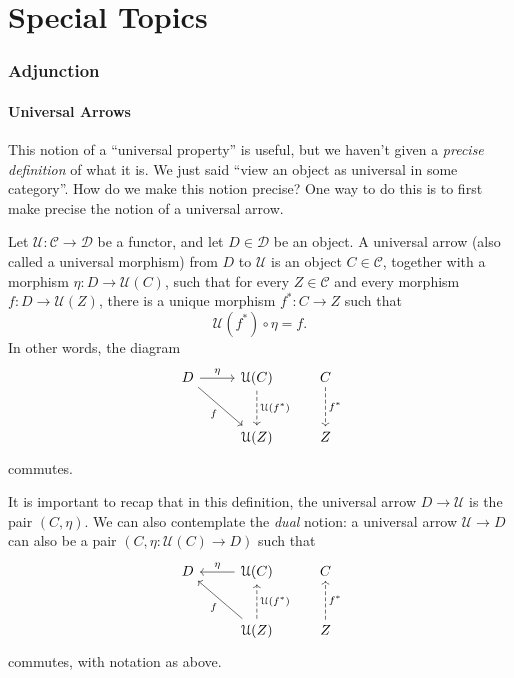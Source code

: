 \part{Special Topics}
\section{Adjunction}

\subsection{Universal Arrows}

This notion of a ``universal property'' is useful, but we haven't given a \emph{precise definition} of what it is. We just said ``view an object as universal in some category''. How do we make this notion precise? One way to do this is to first make precise the notion of a universal arrow.

\begin{definition}\label{dfn:7}
	Let $\mathcal{U} : \mathcal{C}  \to \mathcal{D} $ be a functor, and let $D\in \mathcal{D} $ be an object. A universal arrow (also called a universal morphism) from $D$ to $\mathcal{U} $ is an object $C\in \mathcal{C} $, together with a morphism $\eta : D \to \mathcal{U} (C)$, such that for every $Z\in \mathcal{C} $ and every morphism $f : D \to \mathcal{U} (Z)$, there is a unique morphism $f^*: C \to Z$ such that
	\[
		\mathcal{U} (f^*)\circ \eta =f
	.\]
	In other words, the diagram
	\[\begin{tikzcd}[row sep = 2.5em, column sep = 2.5em]
	D\ar[" \eta  ", r] \ar[" f "', dr]  & \mathcal{U} (C)\ar[" \mathcal{U} (f^*) ", dashed, d]  & C\ar[" f^* ", dashed, d]  \\
	 & \mathcal{U} (Z) & Z
	\end{tikzcd}\]
	commutes.
\end{definition}

It is important to recap that in this definition, the universal arrow $D\to \mathcal{U} $ is the pair $(C,\eta )$. We can also contemplate the \emph{dual} notion: a universal arrow $\mathcal{U} \to D$ can also be a pair $(C,\eta : \mathcal{U} (C) \to D)$ such that
\[\begin{tikzcd}[row sep = 2.5em, column sep = 2.5em]
D & \mathcal{U} (C)\ar[" \eta  "', l]  & C \\
 & \mathcal{U} (Z)\ar[dashed, " \mathcal{U} (f^*) "', u] \ar[" f ", ul]  & Z\ar[dashed, " f^* "', u] 
\end{tikzcd}\]
commutes, with notation as above.

